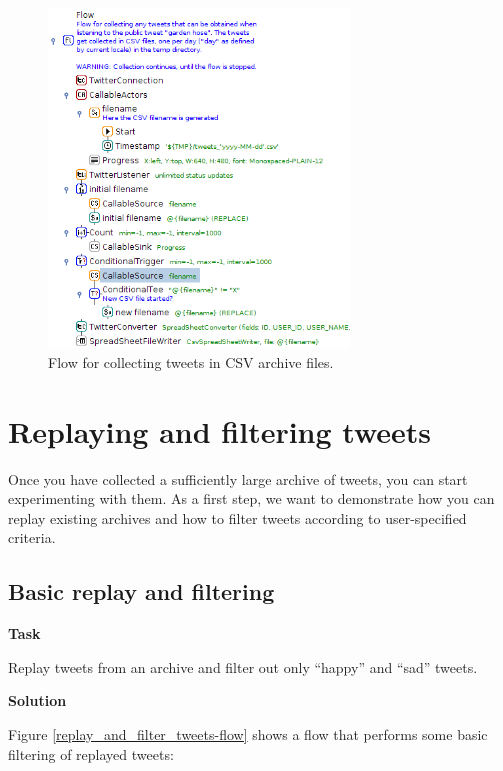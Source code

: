 \documentclass[a4paper,10pt]{book}
\newcommand{\heading}[1]{
  \vspace{0.3cm} \noindent \textbf{#1} \newline
}
\begin{document}
\begin{figure}[htb]
  \centering
  \includegraphics[width=8.0cm]{images/collect_tweets-flow.png}
  \caption{Flow for collecting tweets in CSV archive files.}
  \label{collect_tweets-flow}
\end{figure}

\clearpage
\newpage
\section{Replaying and filtering tweets}
Once you have collected a sufficiently large archive of tweets, you can start experimenting with them. As a first step, we want to demonstrate how you can replay existing archives and how to filter tweets according to user-specified criteria.

\subsection{Basic replay and filtering}

\heading{Task}
Replay tweets from an archive and filter out only ``happy'' and ``sad'' tweets.

\heading{Solution}
Figure \ref{replay_and_filter_tweets-flow} shows a flow that performs some basic filtering of replayed tweets:
\end{document}
